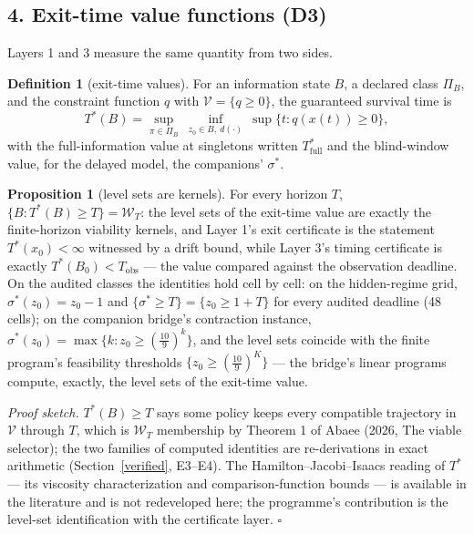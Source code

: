 \documentclass[10pt,twocolumn]{article}
\theoremstyle{definition}
\newtheorem{proposition}{Proposition}
\newtheorem{definition}{Definition}
\begin{document}
\subsection{4. Exit-time value functions (D3)}\label{etv}

Layers 1 and 3 measure the same quantity from two sides.

\begin{definition}[exit-time values]\label{def:etv}
For an information state \(B\), a declared class \(\Pi_{B}\), and the
constraint function \(q\) with \(\mathcal{V} = \{q \ge 0\}\), the
guaranteed survival time is
\[
T^{*}(B) = \sup_{\pi \in \Pi_{B}}\ \inf_{z_{0} \in B,\ d(\cdot)}\
\sup \{ t : q(x(t)) \ge 0 \},
\]
with the full-information value at singletons written \(T^{*}_{\mathrm{full}}\)
and the blind-window value, for the delayed model, the companions'
\(\sigma^{*}\).
\end{definition}

\begin{proposition}[level sets are kernels]\label{prop:levels}
For every horizon \(T\),
\(\{ B : T^{*}(B) \ge T \} = \mathscr{W}_{T}\): the level sets of the
exit-time value are exactly the finite-horizon viability kernels, and
Layer 1's exit certificate is the statement \(T^{*}(x_{0}) < \infty\)
witnessed by a drift bound, while Layer 3's timing certificate is exactly
\(T^{*}(B_{0}) < T_{\mathrm{obs}}\) --- the value compared against the
observation deadline. On the audited classes the identities hold cell by
cell: on the hidden-regime grid, \(\sigma^{*}(z_{0}) = z_{0} - 1\) and
\(\{\sigma^{*} \ge T\} = \{z_{0} \ge 1 + T\}\) for every audited deadline
(48 cells); on the companion bridge's contraction instance,
\(\sigma^{*}(z_{0}) = \max \{k : z_{0} \ge (\tfrac{10}{9})^{k}\}\), and the
level sets coincide with the finite program's feasibility thresholds
\(\{z_{0} \ge (\tfrac{10}{9})^{K}\}\) --- the bridge's linear programs
compute, exactly, the level sets of the exit-time value.
\end{proposition}

\emph{Proof sketch.} \(T^{*}(B) \ge T\) says some policy keeps every
compatible trajectory in \(\mathcal{V}\) through \(T\), which is
\(\mathscr{W}_{T}\) membership by Theorem 1 of Abaee (2026, The viable selector); the two
families of computed identities are re-derivations in exact arithmetic
(Section~\ref{verified}, E3--E4). The Hamilton--Jacobi--Isaacs reading of
\(T^{*}\) --- its viscosity characterization and comparison-function
bounds --- is available in the literature and is not redeveloped here; the
programme's contribution is the level-set identification with the
certificate layer. \hfill\(\square\)
\end{document}

